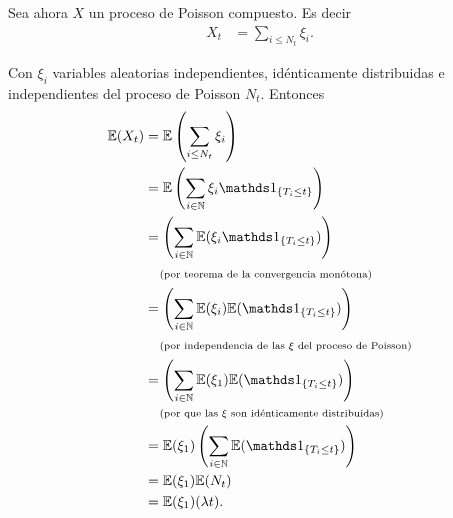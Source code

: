 Sea ahora $X$ un proceso de Poisson compuesto. Es decir
\begin{align}
    X_t     &=  \sum_{i \leq N_t} \xi_i.
\end{align}\pn

Con $\xi_i$ variables aleatorias independientes, idénticamente distribuidas e independientes del proceso de Poisson $N_t$.
Entonces 
\begin{align}
    \E(X_t)     &=  \E\left( \sum_{i \leq N_t} \xi_i \right)                                    \\
                &=  \E\left( \sum_{i \in \N} \xi_i \indic_{\{ T_i \leq t\}} \right)             \\
                &=  \left( \sum_{i \in \N} \E(\xi_i \indic_{\{ T_i \leq t\}}) \right)           \\
                &\comment{por teorema de la convergencia monótona}                              \\
                &=  \left( \sum_{i \in \N} \E(\xi_i) \E(\indic_{\{ T_i \leq t\}}) \right)       \\
                &\comment{por independencia de las $\xi$ del proceso de Poisson}                \\
                &=  \left( \sum_{i \in \N} \E(\xi_1) \E(\indic_{\{ T_i \leq t\}}) \right)       \\
                &\comment{por que las $\xi$ son idénticamente distribuidas}                     \\
                &=  \E(\xi_1) \left( \sum_{i \in \N} \E(\indic_{\{ T_i \leq t\}}) \right)       \\
                &=  \E(\xi_1) \E(N_t)                                                           \\
                &=  \E(\xi_1) (\lambda t).                                                        \\
\end{align}\pn

